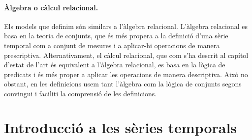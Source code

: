 \paragraph{Àlgebra o càlcul relacional.} Els models que definim són
similars a l'àlgebra relacional. L'àlgebra relacional es basa en la
teoria de conjunts, que és més propera a la definició d'una sèrie
temporal com a conjunt de mesures i a aplicar-hi operacions de manera
prescriptiva. Alternativament, el càlcul relacional, que com s'ha
descrit al capítol d'estat de l'art  és equivalent a
l'àlgebra relacional, es basa en la lògica de predicats i és més
proper a aplicar les operacions de manera descriptiva. Això no
obstant, en les definicions usem tant l'àlgebra com la lògica de
conjunts segons convingui i faciliti la comprensió de les definicions.











\section{Introducció a les sèries temporals}


\todo{}





